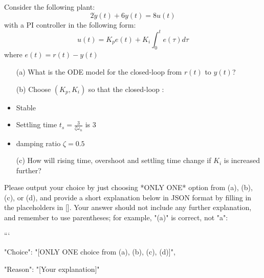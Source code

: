 \documentclass[12pt]{article}
\begin{document}
Consider the following plant:
\begin{equation}
    2\dot{y}(t) + 6y(t) = 8 u(t)
\end{equation}
with a PI controller in the following form:
\begin{equation}
    u(t) = K_p e(t) + K_i \int_0^t e(\tau) d\tau
\end{equation}
where \(e(t) = r(t) - y(t)\)
\begin{itemize}
    \item[(a)] What is the ODE model for the closed-loop from \(r(t)\) to \(y(t)\)?
    \item[(b)] Choose \((K_p,K_i)\) so that the closed-loop :
    \item Stable
    \item Settling time \(t_s = \frac{3}{\zeta \omega_n}\) is \(3\)
    \item damping ratio \(\zeta = 0.5\)
    \item[(c)] How will rising time, overshoot and settling time change if \(K_i\) is increased further?
\end{itemize}
Please output your choice by just choosing *ONLY ONE* option from (a), (b), (c), or (d), and provide a short explanation below in JSON format by filling in the placeholders in []. Your answer should not include any further explanation, and remember to use parentheses; for example, "(a)" is correct, not "a":

```
{

"Choice": "[ONLY ONE choice from (a), (b), (c), (d)]",

"Reason": "[Your explanation]"

}
\end{document}
